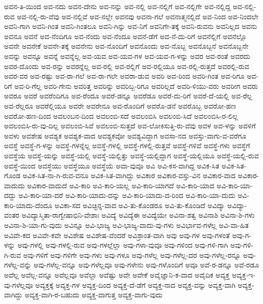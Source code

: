 {ಅವನ-ತಿ-ಯಿಂದ
ಅವ-ನದು
ಅವನ-ದೇನು
ಅವ-ನನ್ನು
ಅವ-ನಲ್ಲಿ
ಅವ-ನಲ್ಲಿಗೆ
ಅವ-ನಲ್ಲಿಗೇ
ಅವ-ನಲ್ಲಿದ್ದ
ಅವ-ನಲ್ಲಿ-ರುವ
ಅವ-ನಲ್ಲಿ-ರು-ವೆವು
ಅವ-ನಲ್ಲಿವೆ
ಅವ-ನಲ್ಲೇ
ಅವನವು
ಅವನಾ-ಗಲೆ
ಅವನಾತ್ಮನಲ್ಲಿದೆ
ಅವ-ನಿಂದ
ಅವ-ನಿಂದಲೇ
ಅವನಿ-ಗಾಗಿ
ಅವನಿ-ಗಿಂತ
ಅವನಿ-ಗಿಂತಲೂ
ಅವನಿ-ಗಿನ್ನು
ಅವ-ನಿಗೆ
ಅವನಿಗೇ-ತಕ್ಕೆ
ಅವನಿ-ರುವನು
ಅವನಿಲ್ಲದ
ಅವನು
ಅವನೂ
ಅವನೆ
ಅವ-ನೆಂದಿಗೂ
ಅವ-ನೆಂದು
ಅವ-ನೆಂದೂ
ಅವನೆ-ಡೆಗೆ
ಅವ-ನೆ-ದು-ರಿಗೆ
ಅವನೆಲ್ಲಿಗೆ
ಅವನೆಲ್ಲೊ
ಅವನೇ
ಅವನೇಕೆ
ಅವನೇ-ತಕ್ಕೆ
ಅವನೇನು
ಅವ-ನೊಂದಿಗೆ
ಅವನೊಂದು
ಅವ-ನೊಬ್ಬ
ಅವನೊಬ್ಬನೆ
ಅವನೊಬ್ಬನೇ
ಅವನ್ನು
ಅವನ್ನೂ
ಅವನ್ನೆ
ಅವನ್ನೆಲ್ಲ
ಅವ-ಯವ
ಅವ-ಯವ-ಗಳ
ಅವ-ಯವ-ಗ-ಳನ್ನು
ಅವರ
ಅವ-ರಂತೆ
ಅವರದು
ಅವರ-ದೊಂದು
ಅವ-ರನ್ನು
ಅವರನ್ನೆಲ್ಲ
ಅವ-ರಲ್ಲಿ
ಅವ-ರಲ್ಲಿಗೆ
ಅವ-ರಲ್ಲಿಯೂ
ಅವ-ರಲ್ಲಿ-ರುತ್ತದೆ
ಅವರಲ್ಲಿ-ರುವ
ಅವರ-ವರ
ಅವ-ರಷ್ಟು
ಅವ-ರಾ-ಗಲೆ
ಅವ-ರಾ-ಗಲೇ
ಅವರಾ-ಡುವ
ಅವರಿ
ಅವ-ರಿಂದ
ಅವರಿ-ಗಿಂತ
ಅವ-ರಿಗೂ
ಅವ-ರಿಗೆ
ಅವ-ರಿ-ಗೆಲ್ಲ
ಅವರಿ-ಗೇನು
ಅವರಿತ್ತ
ಅವರಿನ್ನು
ಅವರಿಬ್ಬ-ರಿಗೂ
ಅವರಿಲ್ಲದೆ
ಅವರಿ-ಳಿಯು-ವರು
ಅವರೀಗ
ಅವರು
ಅವರೂ
ಅವರೆ
ಅವರೆಂದಿಗೂ
ಅವ-ರೆಂದೂ
ಅವರೆ-ಡನ್ನೂ
ಅವರೆಡೂ
ಅವರೆ-ದು-ರಿಗೆ
ಅವರೆ-ದೆ-ಯಲ್ಲಿ
ಅವ-ರೆಲ್ಲ
ಅವ-ರೆಲ್ಲರೂ
ಅವರೆಲ್ಲಿಯೂ
ಅವರೇ
ಅವರೇನೂ
ಅವ-ರೊಂದಿಗೆ
ಅವರೊ-ಡನೆ
ಅವರೊಬ್ಬ
ಅವರೋ-ಹಣ
ಅವರೋ-ಹಣ-ದಿಂದ
ಅವಲಂಬನ-ದಿಂದ
ಅವಲಂಬಿ-ಸದೆ
ಅವಲಂಬಿಸಿ
ಅವಲಂಬಿ-ಸಿದೆ
ಅವಲಂಬಿಸಿ-ರ-ಲಿಲ್ಲ
ಅವಲಂಬಿಸಿ-ರು-ವು-ದಿಲ್ಲ
ಅವಲಂಬಿ-ಸಿವೆ
ಅವಲಂಬಿ-ಸುತ್ತದೆ
ಅವ-ಲೋಕಿಸುತ್ತಿ-ರು-ವೆವು
ಅವಳ
ಅವ-ಳನ್ನು
ಅವಳಿಗೆ
ಅವಳು
ಅವಶೇಷ
ಅವಶ್ಯಕ
ಅವಶ್ಯಕ-ವಾದ
ಅವಶ್ಯಕವೋ
ಅವಶ್ಯವಿದ್ದಾಗ
ಅವಸಾ-ನದ
ಅವಸ್ತು-ವಾಗು-ವ-ವರೆಗೂ
ಅವಸ್ಥೆ
ಅವಸ್ಥೆ-ಗ-ಳನ್ನು
ಅವಸ್ಥೆ-ಗಳನ್ನೆಲ್ಲ
ಅವಸ್ಥೆ-ಗಳಲ್ಲಿ
ಅವಸ್ಥೆ-ಗಳಲ್ಲಿ-ರುತ್ತವೆ
ಅವಸ್ಥೆ-ಗಳಿವೆ
ಅವಸ್ಥೆ-ಗಳು
ಅವಸ್ಥೆಗೆ
ಅವಸ್ಥೆಯ
ಅವಸ್ಥೆ-ಯನ್ನು
ಅವಸ್ಥೆ-ಯಲ್ಲಿ
ಅವಸ್ಥೆ-ಯಲ್ಲಿತ್ತು
ಅವಸ್ಥೆ-ಯಲ್ಲಿದ್ದಾಗ
ಅವಸ್ಥೆ-ಯಲ್ಲಿಯೂ
ಅವಸ್ಥೆ-ಯಲ್ಲಿ-ರುವ
ಅವಸ್ಥೆ-ಯಿಂದ
ಅವಸ್ಥೆಯು
ಅವಸ್ಥೆಯೂ
ಅವಸ್ಥೆಯೆ
ಅವಾ-ವುವೂ
ಅವಿ
ಅವಿ-ಕಸ-ವಾಗಿದ್ದ
ಅವಿಕ-ಸಿತ
ಅವಿಕ-ಸಿತ-ಗೊಂಡ
ಅವಿಕ-ಸಿತ-ನಾ-ಗಿ-ರುವ-ವನೂ
ಅವಿಕ-ಸಿತ-ವಾಗಿದ್ದು
ಅವಿಕಾರ
ಅವಿಕಾರ-ವಸ್ತು-ವಿನ
ಅವಿಕಾರ-ವಾದ
ಅವಿಕಾರ-ವಾದುದು
ಅವಿಕಾರ-ವಾದುದೆ
ಅವಿ-ಕಾರಿ
ಅವಿ-ಕಾರಿ-ಯಲ್ಲ
ಅವಿ-ಕಾರಿ-ಯಾಗದೆ
ಅವಿ-ಕಾರಿ-ಯಾದ
ಅವಿ-ಕಾರಿ-ಯಾ-ದದ್ದು
ಅವಿ-ಕಾರಿ-ಯಾ-ದರೆ
ಅವಿ-ಕಾರಿ-ಯಾದು-ದನ್ನು
ಅವಿ-ಕಾರಿ-ಯಾದು-ದ-ರಿಂದ
ಅವಿ-ಕಾರಿ-ಯಾ-ದುದು
ಅವಿ-ಕಾರಿ-ಯಾದು-ದೆಂದೂ
ಅವಿಕಾ-ಸದ
ಅವಿಚ್ಛಿನ್ನ-ವಾದ
ಅವಿ-ತು-ಕೊಂಡರೂ
ಅವಿ-ತು-ಕೊಂಡಿದೆ
ಅವಿದ್ಯಾ
ಅವಿದ್ಯಾ-ವಂತರ
ಅವಿದ್ಯಾಸ್ಮಿತಾ-ರಾಗ್ವೇಷಾಭಿನಿ-ವೇಶಾಃ
ಅವಿದ್ಯೆ
ಅವಿದ್ಯೆಈ
ಅವಿದ್ಯೆಯೇ
ಅವಿನಾ-ಶತ್ವ
ಅವಿನಾಶಿ
ಅವಿನಾ-ಶಿ-ಗಳು
ಅವಿನಾ-ಶಿ-ಯಾ-ಗು-ವುದು
ಅವಿನ್ನೂ
ಅವಿ-ಭಾಜ್ಯ
ಅವಿ-ಭಾಜ್ಯ-ವಾದು-ವು-ಗಳು
ಅವಿರ್ಭಾವ-ಗಳೆಲ್ಲ
ಅವಿ-ವಾ-ಹಿತ
ಅವಿವೇ-ಕದ
ಅವಿವೇ-ಕವೇ
ಅವಿಶೇಷ
ಅವಿಶೇಷ-ವೆಂದರೆ
ಅವಿಶ್ರಾಂತ-ವಾಗಿ
ಅವು
ಅವು-ಗಳ
ಅವು-ಗಳಂತೆ
ಅವು-ಗ-ಳನ್ನು
ಅವು-ಗಳಲ್ಲಿ
ಅವು-ಗಳಲ್ಲಿ-ರುವ
ಅವು-ಗಳಲ್ಲೆಲ್ಲಾ
ಅವು-ಗಳಾ-ವುವೂ
ಅವು-ಗಳಿಂದ
ಅವು-ಗಳಿ-ಗಾಗಿ
ಅವು-ಗಳಿ-ಗಿ-ರುವ
ಅವು-ಗಳಿಗೆ
ಅವು-ಗಳಿಗೇ
ಅವು-ಗಳು
ಅವು-ಗಳೂ
ಅವು-ಗಳೆಲ್ಲ
ಅವು-ಗಳೆಲ್ಲ-ದರ
ಅವು-ಗಳೆಲ್ಲ-ರನ್ನೂ
ಅವು-ಗಳೆಲ್ಲ-ವನ್ನು
ಅವು-ಗಳೆಲ್ಲ-ವನ್ನೂ
ಅವು-ಗಳೆಲ್ಲವೂ
ಅವು-ಗಳೇನು
ಅವು-ಗಳೊಂದಿಗೆ
ಅವೂ
ಅವೆ-ರ-ಡನ್ನೂ
ಅವೆ-ರಡೂ
ಅವೆಲ್ಲ
ಅವೆಲ್ಲ-ವನ್ನೂ
ಅವೆಲ್ಲವೂ
ಅವೆಲ್ಲಾ
ಅವೆಷ್ಟು
ಅವೇ
ಅವೇಕೆ
ಅವೈಜ್ಞಾನಿ-ಕ-ವಾದ
ಅವೈದಿಕ
ಅವ್ಯಕ್ತ
ಅವ್ಯಕ್ತ-ಇ-ವು-ಗಳೆಲ್ಲವೂ
ಅವ್ಯಕ್ತಕ್ಕೆ
ಅವ್ಯಕ್ತ-ಗಳ
ಅವ್ಯಕ್ತ-ದಿಂದ
ಅವ್ಯಕ್ತ-ದೆ-ಡೆಗೆ
ಅವ್ಯಕ್ತ-ನಾದ
ಅವ್ಯಕ್ತ-ವನ್ನು
ಅವ್ಯಕ್ತ-ವಾಗಿ
ಅವ್ಯಕ್ತ-ವಾಗಿದ್ದು
ಅವ್ಯಕ್ತ-ವಾಗಿ-ರ-ಬಹುದು
ಅವ್ಯಕ್ತ-ವಾಗುತ್ತ
ಅವ್ಯಕ್ತ-ವಾಗು-ವುದು
}
